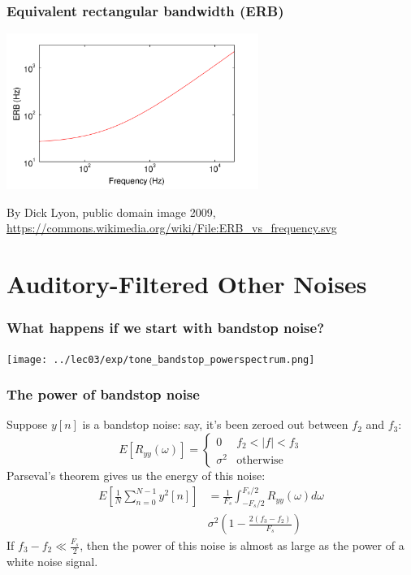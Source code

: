 \begin{frame}
  \frametitle{Equivalent rectangular bandwidth (ERB)}

  \centerline{\includegraphics[height=2in]{2560px-ERB_vs_frequency.png}}
  \begin{tiny}
    By Dick Lyon, public domain image 2009,
    \url{https://commons.wikimedia.org/wiki/File:ERB_vs_frequency.svg}
  \end{tiny}
\end{frame}

\section[Bandstop]{Auditory-Filtered Other Noises}
\setcounter{subsection}{1}

\begin{frame}
  \frametitle{What happens if we start with bandstop noise?}

  \centerline{\texttt{[image: ../lec03/exp/tone\_bandstop\_powerspectrum.png]}}
\end{frame}

\begin{frame}
  \frametitle{The power of bandstop noise}

  Suppose $y[n]$ is a bandstop noise: say, it's been zeroed out between $f_2$ and $f_3$:
  \[
  E\left[R_{yy}(\omega)\right] = \begin{cases}
    0 & f_2 < |f| < f_3\\
    \sigma^2 &  \mbox{otherwise}
  \end{cases}
  \]
  Parseval's theorem gives us the energy of this noise:
  \begin{align*}
    E\left[\frac{1}{N}\sum_{n=0}^{N-1}y^2[n]\right]
    &=\frac{1}{F_s}\int_{-F_s/2}^{F_s/2} R_{yy}(\omega)d\omega\\
    & \sigma^2\left(1-\frac{2(f_3-f_2)}{F_s}\right)
  \end{align*}
  If $f_3-f_2\ll \frac{F_s}{2}$, then the power of this noise is
  almost as large as the power of a white noise signal.
\end{frame}


